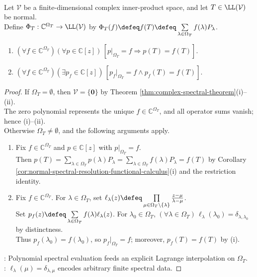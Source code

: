 \begin{theorem} \label{thm:finite-spectral-functional-calculus-normal} \\
Let $\mathcal{V}$ be a finite-dimensional complex inner-product space, and let $T\in\LL(\mathcal{V})$ be normal.\\
Define $\Phi_T:\mathbb{C}^{\Omega_T}\to\LL(\mathcal{V})$ by $\Phi_T(f)\defeq f(T)\defeq\sum\limits_{\lambda\in\Omega_T}f(\lambda)P_{\lambda}$.
\begin{enumerate}[label=(\roman*)]
\setlength{\itemsep}{0pt}
\item $(\forall f\in\mathbb{C}^{\Omega_T})(\forall p\in\mathbb{C}[z])\,[p|_{\Omega_T}=f\Longrightarrow p(T)=f(T)]$.
\item $(\forall f\in\mathbb{C}^{\Omega_T})(\exists p_f\in\mathbb{C}[z])\,[p_f|_{\Omega_T}=f\land p_f(T)=f(T)]$.
\end{enumerate}
\begin{proof}
If $\Omega_T=\emptyset$, then $\mathcal{V}=\{\mathbf{0}\}$ by Theorem \ref{thm:complex-spectral-theorem}(i)--(ii).\\
The zero polynomial represents the unique $f\in\mathbb{C}^{\Omega_T}$, and all operator sums vanish; hence (i)--(ii).\\
Otherwise $\Omega_T\neq\emptyset$, and the following arguments apply.
\begin{enumerate}[label=(\roman*)]
\setlength{\itemsep}{0pt}
\item Fix $f\in\mathbb{C}^{\Omega_T}$ and $p\in\mathbb{C}[z]$ with $p|_{\Omega_T}=f$.\\
Then $p(T)=\sum\limits_{\lambda\in\Omega_T}p(\lambda)P_{\lambda}=\sum\limits_{\lambda\in\Omega_T}f(\lambda)P_{\lambda}=f(T)$ by Corollary \ref{cor:normal-spectral-resolution-functional-calculus}(i) and the restriction identity.
\item Fix $f\in\mathbb{C}^{\Omega_T}$. For $\lambda\in\Omega_T$, set $\ell_{\lambda}(z)\defeq\prod\limits_{\mu\in\Omega_T\setminus\{\lambda\}}\frac{z-\mu}{\lambda-\mu}$.\\
Set $p_f(z)\defeq\sum\limits_{\lambda\in\Omega_T}f(\lambda)\ell_{\lambda}(z)$. For $\lambda_0\in\Omega_T$, $(\forall\lambda\in\Omega_T)\,\ell_{\lambda}(\lambda_0)=\delta_{\lambda,\lambda_0}$ by distinctness.\\
Thus $p_f(\lambda_0)=f(\lambda_0)$, so $p_f|_{\Omega_T}=f$; moreover, $p_f(T)=f(T)$ by (i).
\end{enumerate}
: Polynomial spectral evaluation feeds an explicit Lagrange interpolation on $\Omega_T$.\\
: $\ell_{\lambda}(\mu)=\delta_{\lambda,\mu}$ encodes arbitrary finite spectral data.
\end{proof}
\end{theorem}

